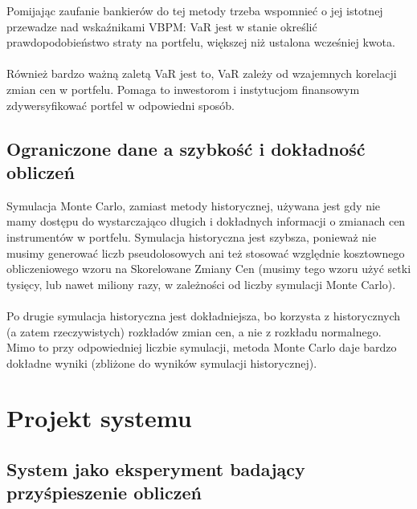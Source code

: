 \documentclass[11pt,titlepage]{article}
\begin{document}
Pomijając zaufanie bankierów do tej metody trzeba wspomnieć o jej istotnej przewadze nad wskaźnikami VBPM: VaR jest w stanie określić prawdopodobieństwo straty na portfelu, większej niż ustalona wcześniej kwota. \\
\\

Również bardzo ważną zaletą VaR jest to, VaR zależy od wzajemnych korelacji zmian cen w portfelu. Pomaga to inwestorom i instytucjom finansowym zdywersyfikować portfel w odpowiedni sposób.


\subsection{Ograniczone dane a szybkość i dokładność obliczeń}
Symulacja Monte Carlo, zamiast metody historycznej, używana jest gdy nie mamy dostępu do wystarczająco długich i dokładnych informacji o zmianach cen instrumentów w portfelu. Symulacja historyczna jest szybsza, ponieważ nie musimy generować liczb pseudolosowych ani też stosować względnie kosztownego obliczeniowego wzoru na Skorelowane Zmiany Cen (musimy tego wzoru użyć setki tysięcy, lub nawet miliony razy, w zależności od liczby symulacji Monte Carlo). \\
\\
Po drugie symulacja historyczna jest dokładniejsza, bo korzysta z historycznych (a zatem rzeczywistych) rozkładów zmian cen, a nie z rozkładu normalnego. Mimo to przy odpowiedniej liczbie symulacji, metoda Monte Carlo daje bardzo dokładne wyniki (zbliżone do wyników symulacji historycznej).

\newpage

\section{Projekt systemu}


\subsection{System jako eksperyment badający przyśpieszenie obliczeń}
\end{document}
